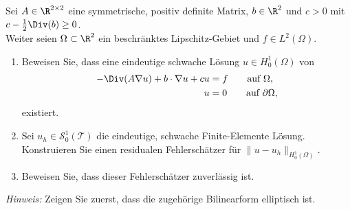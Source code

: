 
\begin{exercise}

Sei $A \in \R^{2\times2}$ eine symmetrische, positiv definite Matrix, $b \in \R^2$
und $c > 0$ mit $c - \frac{1}{2}\Div(b) \geq 0$. \\
Weiter seien $\Omega \subset \R^2$ ein beschränktes Lipschitz-Gebiet und $f \in L^2(\Omega)$.
\begin{enumerate}[label = \textbf{\alph*)}]
  \item Beweisen Sie, dass eine eindeutige schwache Lösung $u \in H_0^1(\Omega)$ von
  \begin{subequations}
    \begin{align}
      -\Div(A\nabla u) + b \cdot \nabla u + cu &= f \qquad \text{auf } \Omega, \label{eq:1A} \\
      u &= 0 \qquad \text{auf } \partial\Omega, \label{eq:1B}
    \end{align}
  \end{subequations}
  existiert.
  \item Sei $u_h \in \mathcal{S}_0^1(\mathcal{T})$ die eindeutige, schwache
  Finite-Elemente Lösung. Konstruieren Sie einen residualen Fehlerschätzer für
  $\|u-u_h\|_{H_0^1(\Omega)}$.
  \item Beweisen Sie, dass dieser Fehlerschätzer zuverlässig ist.
\end{enumerate}
\textit{Hinweis:} Zeigen Sie zuerst, dass die zugehörige Bilinearform elliptisch ist.
\end{exercise}


\begin{solution}

\phantom{}

\end{solution}

